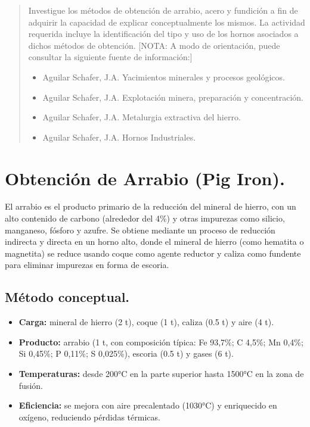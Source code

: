 \documentclass[12pt,a4paper]{article}
\begin{document}

\newpage
\tableofcontents

\begin{abstract}
    Investigue los métodos de obtención de arrabio, acero y fundición a fin de adquirir la capacidad de explicar conceptualmente los mismos. La actividad requerida incluye la identificación del tipo y uso de los hornos asociados a dichos métodos de obtención. [NOTA: A modo de orientación, puede consultar la siguiente fuente de información:]
    \begin{itemize}
        \item Aguilar Schafer, J.A. Yacimientos minerales y procesos geológicos.
        \item Aguilar Schafer, J.A. Explotación minera, preparación y concentración.
        \item Aguilar Schafer, J.A. Metalurgia extractiva del hierro.
        \item Aguilar Schafer, J.A. Hornos Industriales.
    \end{itemize}
\end{abstract}

\section{Obtención de Arrabio (Pig Iron).}

El arrabio es el producto primario de la reducción del mineral de hierro, con un alto contenido de carbono (alrededor del 4\%) y otras impurezas como silicio, manganeso, fósforo y azufre. Se obtiene mediante un proceso de reducción indirecta y directa en un horno alto, donde el mineral de hierro (como hematita o magnetita) se reduce usando coque como agente reductor y caliza como fundente para eliminar impurezas en forma de escoria.

\subsection{Método conceptual.}

\begin{itemize}
    \item \textbf{Carga:} mineral de hierro (2 t), coque (1 t), caliza (0.5 t) y aire (4 t).
    \item \textbf{Producto:} arrabio (1 t, con composición típica: Fe 93,7\%; C 4,5\%; Mn 0,4\%; Si 0,45\%; P 0,11\%; S 0,025\%), escoria (0.5 t) y gases (6 t).
    \item \textbf{Temperaturas:} desde 200°C en la parte superior hasta 1500°C en la zona de fusión.
    \item \textbf{Eficiencia:} se mejora con aire precalentado (1030°C) y enriquecido en oxígeno, reduciendo pérdidas térmicas.
\end{itemize}
\end{document}
